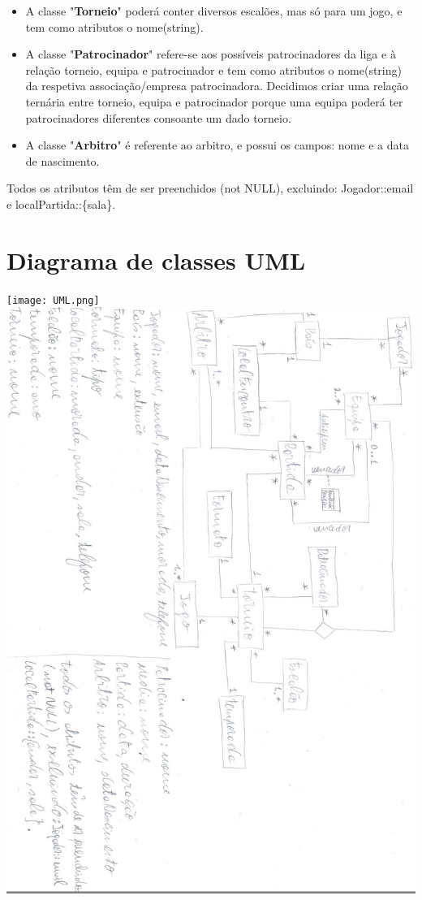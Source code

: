 \documentclass[a4paper]{article}
\begin{document}
\begin{itemize}
\item A classe "\textbf{Torneio}" poderá conter diversos escalões, mas só para um jogo, e tem como atributos o nome(string).

\item A classe "\textbf{Patrocinador}" refere-se aos possíveis patrocinadores da liga e à relação torneio, equipa e patrocinador e tem como atributos o nome(string) da respetiva associação/empresa patrocinadora. Decidimos criar uma relação ternária entre torneio, equipa e patrocinador porque uma equipa poderá ter patrocinadores diferentes consoante um dado torneio.

\item A classe "\textbf{Arbitro}" é referente ao arbitro, e possui os campos: nome e a data de nascimento.
\end{itemize}

Todos os atributos têm de ser preenchidos (not NULL), excluindo: Jogador::email e localPartida::\{sala\}.


\section{Diagrama de classes UML}

\begin{center}
  \texttt{[image: UML.png]}
  \includegraphics[scale=0.83]{BDAD_DIAGRAMA.jpeg}
\end{center}

\clearpage
{}
\renewcommand\refname{Bibliografia}


\end{document}
